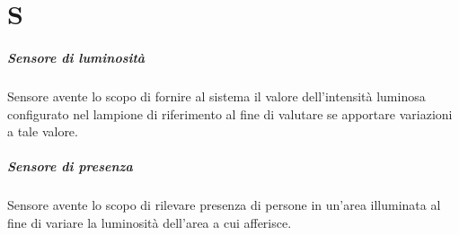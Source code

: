 \chapter{S}

\paragraph*{Sensore di luminosità}
Sensore avente lo scopo di fornire al sistema il valore dell'intensità luminosa configurato nel lampione di riferimento al fine di valutare se apportare variazioni a tale valore.

\paragraph*{Sensore di presenza}
Sensore avente lo scopo di rilevare presenza di persone in un'area illuminata al fine di variare la luminosità dell'area a cui afferisce.